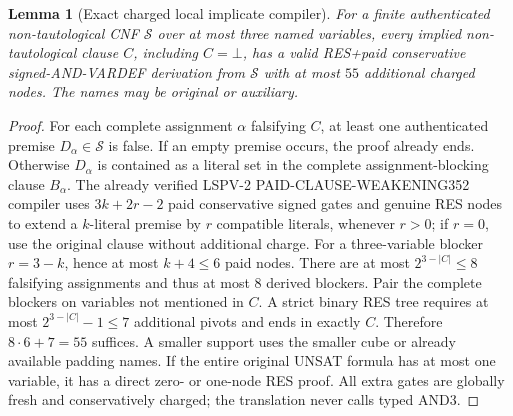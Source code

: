\documentclass[11pt]{article}
\newtheorem{lemma}[theorem]{Lemma}
\begin{document}
\begin{lemma}[Exact charged local implicate compiler]
For a finite authenticated non-tautological CNF \(\mathcal S\) over at most three named variables, every implied non-tautological clause \(C\), including \(C=\bot\), has a valid RES+paid conservative signed-AND-VARDEF derivation from \(\mathcal S\) with at most \(\boxed{55}\) additional charged nodes. The names may be original or auxiliary.
\end{lemma}
\begin{proof}
For each complete assignment \(\alpha\) falsifying \(C\), at least one authenticated premise \(D_\alpha\in\mathcal S\) is false. If an empty premise occurs, the proof already ends. Otherwise \(D_\alpha\) is contained as a literal set in the complete assignment-blocking clause \(B_\alpha\). The already verified LSPV-2 PAID-CLAUSE-WEAKENING352 compiler uses \(3k+2r-2\) paid conservative signed gates and genuine RES nodes to extend a \(k\)-literal premise by \(r\) compatible literals, whenever \(r>0\); if \(r=0\), use the original clause without additional charge. For a three-variable blocker \(r=3-k\), hence at most \(k+4\le6\) paid nodes. There are at most \(2^{3-|C|}\le8\) falsifying assignments and thus at most 8 derived blockers. Pair the complete blockers on variables not mentioned in \(C\). A strict binary RES tree requires at most \(2^{3-|C|}-1\le7\) additional pivots and ends in exactly \(C\). Therefore \(8\cdot6+7=55\) suffices. A smaller support uses the smaller cube or already available padding names. If the entire original UNSAT formula has at most one variable, it has a direct zero- or one-node RES proof. All extra gates are globally fresh and conservatively charged; the translation never calls typed AND3.
\end{proof}
\end{document}
